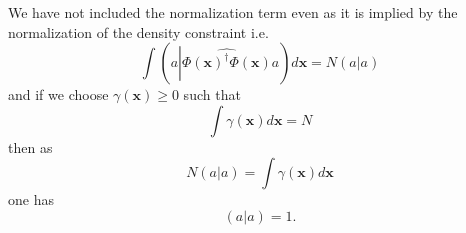 \documentclass[aps,preprint]{revtex4}%
\begin{document}
We have not included the normalization term even as it is implied by the
normalization of the density constraint i.e.
\begin{equation}
\int\left(  a\left\vert \widehat{\Phi\left(  \mathbf{x}\right)  ^{\dagger}%
\Phi\left(  \mathbf{x}\right)  }\right.  a\right)  d\mathbf{x}=N\left(
a\left\vert \overset{}{a}\right.  \right)
\end{equation}
and if we choose $\gamma\left(  \mathbf{x}\right)  \geq0$ such that
\begin{equation}
\int\gamma\left(  \mathbf{x}\right)  d\mathbf{x}=N
\end{equation}
then as
\begin{equation}
N\left(  a\left\vert \overset{}{a}\right.  \right)  =\int\gamma\left(
\mathbf{x}\right)  d\mathbf{x}%
\end{equation}
one has
\begin{equation}
\left(  a\left\vert \overset{}{a}\right.  \right)  =1.
\end{equation}
\end{document}
